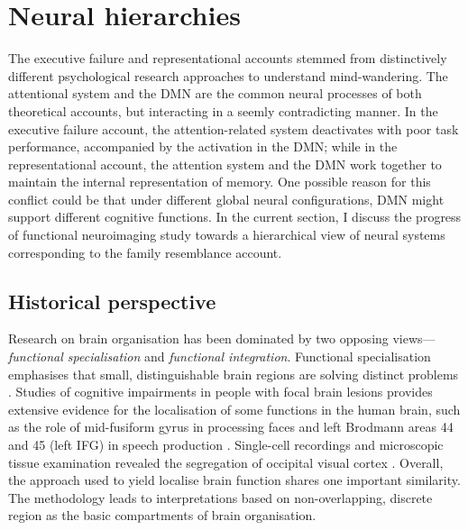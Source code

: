 \section{Neural hierarchies}
\label{ch:intro:neural}

The executive failure and representational accounts stemmed from distinctively different psychological research approaches to understand mind-wandering. The attentional system and the DMN are the common neural processes of both theoretical accounts, but interacting in a seemly contradicting manner. In the executive failure account, the attention-related system deactivates with poor task performance, accompanied by the activation in the DMN; while in the representational account, the attention system and the DMN work together to maintain the internal representation of memory. 
One possible reason for this conflict could be that under different global neural configurations, DMN might support different cognitive functions. 
In the current section, I discuss the progress of functional neuroimaging study towards a hierarchical view of neural systems corresponding to the family resemblance account.

\subsection{Historical perspective}

Research on brain organisation has been dominated by two opposing views---\textit{functional specialisation} and \textit{functional integration}. Functional specialisation emphasises that small, distinguishable brain regions are solving distinct problems \cite{Kanwisher2010}. Studies of cognitive impairments in people with focal brain lesions provides extensive evidence for the localisation of some functions in the human brain, such as the role of mid-fusiform gyrus in processing faces \cite{Iaria2008} and left Brodmann areas 44 and 45 (left IFG) in speech production \cite{Broca1861}. Single-cell recordings and microscopic tissue examination revealed the segregation of occipital visual cortex \cite{Zeki1978}. Overall, the approach used to yield localise brain function shares one important similarity. The methodology leads to interpretations based on non-overlapping, discrete region as the basic compartments of brain organisation. 

